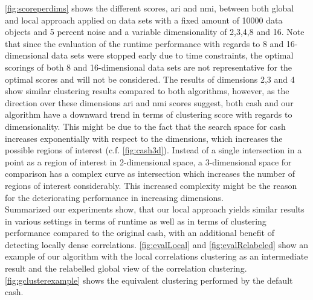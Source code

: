 \autoref{fig:scoreperdims} shows the different scores, \gls{ari} and \gls{nmi}, between both global and local approach applied on data sets with a fixed amount of 10000 data objects and 5 percent noise and a variable dimensionality of 2,3,4,8 and 16.
Note that since the evaluation of the runtime performance with regards to 8 and 16-dimensional data sets were stopped early due to time constraints, the optimal scorings of both 8 and 16-dimensional data sets are not representative for the optimal scores and will not be considered. 
The results of dimensions 2,3 and 4 show similar clustering results compared to both algorithms, however, as the direction over these dimensions \gls{ari} and \gls{nmi} scores suggest, both \gls{cash} and our algorithm have a downward trend in terms of clustering score with regards to dimensionality. This might be due to the fact that the search space for \gls{cash} increases exponentially with respect to the dimensions, which increases the possible regions of interest (c.f. \autoref{fig:cash3d}). Instead of a single intersection in a point as a region of interest in 2-dimensional space, a 3-dimensional space for comparison has a complex curve as intersection which increases the number of regions of interest considerably. This increased complexity might be the reason for the deteriorating performance in increasing dimensions. \\

Summarized our experiments show, that our local approach yields similar results in various settings in terms of runtime as well as in terms of clustering performance compared to the original \gls{cash}, with an additional benefit of detecting locally dense correlations. \autoref{fig:evalLocal} and \autoref{fig:evalRelabeled} show an example of our algorithm with the local correlations clustering as an intermediate result and the relabelled global view of the correlation clustering. \autoref{fig:gclusterexample} shows the equivalent clustering performed by the default \gls{cash}. 

